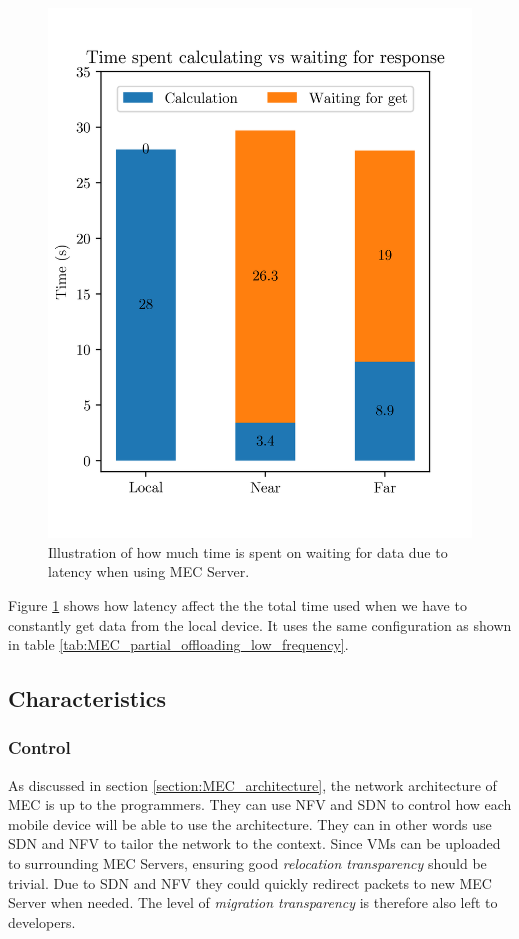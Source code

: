 \begin{figure}[t]
    \centering
    \includegraphics[scale=1]{chapters/6_evaluation/figures/MEC_Partial_bar.png}
    \caption{Illustration of how much time is spent on waiting for data due to latency when using MEC Server.}
    \label{fig:MEC_partial_bar}
\end{figure}

Figure \ref{fig:MEC_partial_bar} shows how latency affect the the total time used when we have to constantly get data from the local device. It uses the same configuration as shown in table \ref{tab:MEC_partial_offloading_low_frequency}.





\subsection{Characteristics}

\subsubsection{Control}
As discussed in section \ref{section:MEC_architecture}, the network architecture of MEC is up to the programmers. They can use NFV and SDN to control how each mobile device will be able to use the architecture. They can in other words use SDN and NFV to tailor the network to the context. Since VMs can be uploaded to surrounding MEC Servers, ensuring good \textit{relocation transparency} should be trivial. Due to SDN and NFV they could quickly redirect packets to new MEC Server when needed. The level of \textit{migration transparency} is therefore also left to developers.

